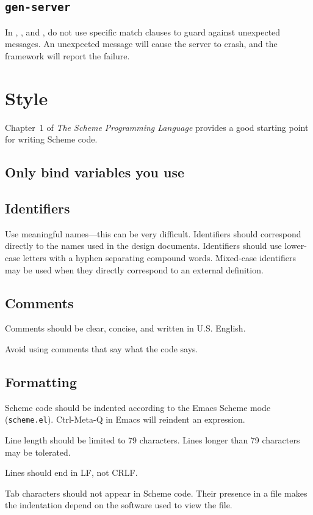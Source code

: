 \documentclass[letterpaper,11pt,twoside,final]{article}
\begin{document}
\subsection* {\texttt{gen-server}}

In , , and
, do not use specific match clauses to guard
against unexpected messages. An unexpected message will cause the
server to crash, and the framework will report the failure.

\section* {Style}

Chapter~1 of \emph{The Scheme Programming Language} provides a good
starting point for writing Scheme code.

\subsection* {Only bind variables you use}

\subsection* {Identifiers}

Use meaningful names---this can be very difficult. Identifiers should
correspond directly to the names used in the design
documents. Identifiers should use lower-case letters with a hyphen
separating compound words. Mixed-case identifiers may be used when
they directly correspond to an external definition.

\subsection* {Comments}

Comments should be clear, concise, and written in U.S. English.

Avoid using comments that say what the code says.

\subsection* {Formatting}

Scheme code should be indented according to the Emacs Scheme mode
(\texttt{scheme.el}). Ctrl-Meta-Q in Emacs will reindent an
expression.

Line length should be limited to 79 characters. Lines longer than 79
characters may be tolerated.

Lines should end in LF, not CRLF.

Tab characters should not appear in Scheme code. Their presence in a
file makes the indentation depend on the software used to view the
file.


\end{document}
